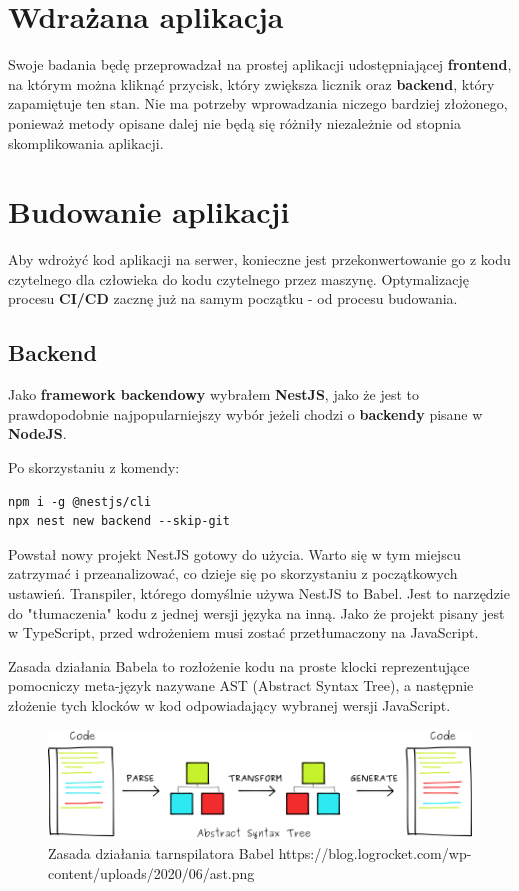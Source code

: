 \documentclass{article}
\begin{document}
\section{Wdrażana aplikacja}

Swoje badania będę przeprowadzał na prostej aplikacji udostępniającej \textbf{frontend}, na którym można kliknąć przycisk, który zwiększa licznik oraz \textbf{backend}, który zapamiętuje ten stan. Nie ma potrzeby wprowadzania niczego bardziej złożonego, ponieważ metody opisane dalej nie będą się różniły niezależnie od stopnia skomplikowania aplikacji.

\section{Budowanie aplikacji}

Aby wdrożyć kod aplikacji na serwer, konieczne jest przekonwertowanie go z kodu czytelnego dla człowieka do kodu czytelnego przez maszynę. Optymalizację procesu \textbf{CI/CD} zacznę już na samym początku - od procesu budowania.

\subsection{Backend}

Jako \textbf{framework backendowy} wybrałem \textbf{NestJS}, jako że jest to prawdopodobnie najpopularniejszy wybór jeżeli chodzi o \textbf{backendy} pisane w \textbf{NodeJS}.

Po skorzystaniu z komendy:
\begin{lstlisting}[caption=Komenda uruchamiająca scaffolding projektu NestJS]
npm i -g @nestjs/cli
npx nest new backend --skip-git
\end{lstlisting}

Powstał nowy projekt NestJS gotowy do użycia. Warto się w tym miejscu zatrzymać i przeanalizować, co dzieje się po skorzystaniu z początkowych ustawień. Transpiler, którego domyślnie używa NestJS to Babel. Jest to narzędzie do "tłumaczenia" kodu z jednej wersji języka na inną. Jako że projekt pisany jest w TypeScript, przed wdrożeniem musi zostać przetłumaczony na JavaScript.

Zasada działania Babela to rozłożenie kodu na proste klocki reprezentujące pomocniczy meta-język nazywane AST (Abstract Syntax Tree), a następnie złożenie tych klocków w kod odpowiadający wybranej wersji JavaScript.


\begin{figure}[H]
    \centering
    \includegraphics[width=\textwidth]{ast.png}
    \caption{Zasada działania tarnspilatora Babel https://blog.logrocket.com/wp-content/uploads/2020/06/ast.png}
    \label{fig:ast}
\end{figure}
\end{document}
